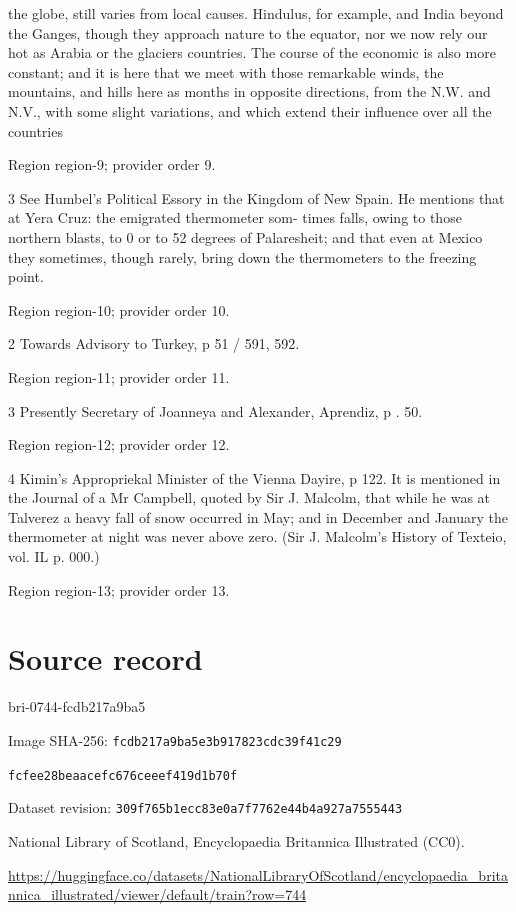 \documentclass[11pt]{article}
\begin{document}
the globe, still varies from local causes. Hindulus, for example, and India beyond the Ganges, though they approach nature to the equator, nor we now rely our hot as Arabia or the glaciers countries. The course of the economic is also more constant; and it is here that we meet with those remarkable winds, the mountains, and hills here as months in opposite directions, from the N.W. and N.V., with some slight variations, and which extend their influence over all the countries
\par

{\scriptsize\color{gray} Region region-9; provider order 9.\par}
\medskip

3 See Humbel's Political Essory in the Kingdom of New Spain. He mentions that at Yera Cruz: the emigrated thermometer som- times falls, owing to those northern blasts, to 0 or to 52 degrees of Palaresheit; and that even at Mexico they sometimes, though rarely, bring down the thermometers to the freezing point.
\par

{\scriptsize\color{gray} Region region-10; provider order 10.\par}
\medskip

2 Towards Advisory to Turkey, p 51 / 591, 592.
\par

{\scriptsize\color{gray} Region region-11; provider order 11.\par}
\medskip

3 Presently Secretary of Joanneya and Alexander, Aprendiz, p . 50.
\par

{\scriptsize\color{gray} Region region-12; provider order 12.\par}
\medskip

4 Kimin's Appropriekal Minister of the Vienna Dayire, p 122. It is mentioned in the Journal of a Mr Campbell, quoted by Sir J. Malcolm, that while he was at Talverez a heavy fall of snow occurred in May; and in December and January the thermometer at night was never above zero. (Sir J. Malcolm's History of Texteio, vol. IL p. 000.)
\par

{\scriptsize\color{gray} Region region-13; provider order 13.\par}
\medskip
\newpage\section*{Source record}
bri-0744-fcdb217a9ba5\par
Image SHA-256: \texttt{fcdb217a9ba5e3b917823cdc39f41c29}\par\texttt{fcfee28beaacefc676ceeef419d1b70f}\par
Dataset revision: \texttt{309f765b1ecc83e0a7f7}\texttt{762e44b4a927a7555443}\par
National Library of Scotland, Encyclopaedia Britannica Illustrated (CC0).\par
\url{https://huggingface.co/datasets/NationalLibraryOfScotland/encyclopaedia_britannica_illustrated/viewer/default/train?row=744}
\end{document}
